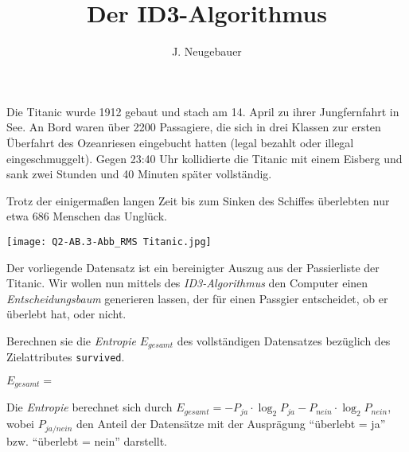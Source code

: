 \documentclass[10pt, a4paper]{scrartcl}
\author{J. Neugebauer}
\title{Der ID3-Algorithmus}
\date{\Heute}
\begin{document}
\ReiheTitel

\begin{rahmen}\small
	\begin{minipage}{0.69\textwidth}
		Die Titanic wurde 1912 gebaut und stach am 14. April zu ihrer Jungfernfahrt in See. An Bord waren über 2200 Passagiere, die sich in drei Klassen zur ersten Überfahrt des Ozeanriesen eingebucht hatten (legal bezahlt oder illegal eingeschmuggelt). Gegen 23:40 Uhr kollidierte die Titanic mit einem Eisberg und sank zwei Stunden und 40 Minuten später vollständig.
		
		Trotz der einigermaßen langen Zeit bis zum Sinken des Schiffes überlebten nur etwa 686 Menschen das Unglück.
	\end{minipage} \hfill
	\begin{minipage}{0.3\textwidth}
		\begin{center}
			\texttt{[image: Q2-AB.3-Abb\_RMS Titanic.jpg]}
		\end{center}
	\end{minipage}
\end{rahmen}
\bigskip

Der vorliegende Datensatz ist ein bereinigter Auszug aus der Passierliste der Titanic. Wir wollen nun mittels des \emph{ID3-Algorithmus} den Computer einen \emph{Entscheidungsbaum} generieren lassen, der für einen Passgier entscheidet, ob er überlebt hat, oder nicht.

\begin{aufgabe}
	Berechnen sie die \emph{Entropie} $E_{gesamt}$ des vollständigen Datensatzes bezüglich des Zielattributes 
	\texttt{survived}.
	
	\begin{center}
		$E_{gesamt} = $\linie[12cm]
	\end{center}
		
	\begin{infobox}
		Die \emph{Entropie} berechnet sich durch $E_{gesamt} = -P_{ja}\cdot \log_2{P_{ja}} -P_{nein}\cdot \log_2{P_{nein}}$, wobei $P_{ja/nein}$ den Anteil der Datensätze mit der Ausprägung \enquote{überlebt = ja} bzw. \enquote{überlebt = nein} darstellt.
	\end{infobox}
\end{aufgabe}
\end{document}
